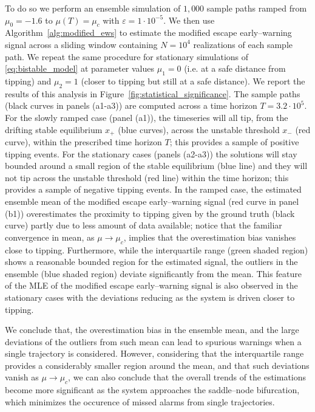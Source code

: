 To do so we perform an ensemble simulation of $1{,}000$ sample paths ramped from $\mu_0=-1.6$ to $\mu(T)=\mu_c$ with $\varepsilon=1\cdot10^{-5}$.
We then use Algorithm~\ref{alg:modified_ews} to estimate the modified escape early--warning signal across a sliding window containing $N=10^4$ realizations of each sample path.
We repeat the same procedure for stationary simulations of \eqref{eq:bistable_model} at parameter values $\mu_1=0$ (i.e. at a safe distance from tipping) and $\mu_2=1$ (closer to tipping but still at a safe distance).
We report the results of this analysis in Figure~\ref{fig:statistical_significance}.
The sample paths (black curves in panels (a1-a3)) are computed across a time horizon $T=3.2\cdot10^5$. 
For the slowly ramped case (panel (a1)), the timeseries will all tip, from the drifting stable equilibrium $x_+$ (blue curves), across the unstable threshold $x_-$ (red curve), within the prescribed time horizon $T$; this provides a sample of positive tipping events.
For the stationary cases (panels (a2-a3)) the solutions will stay bounded around a small region of the stable equilibrium (blue line) and they will not tip across the unstable threshold (red line) within the time horizon; this provides a sample of negative tipping events.
In the ramped case, the estimated ensemble mean of the modified escape early--warning signal (red curve in panel (b1)) overestimates the proximity to tipping given by the ground truth (black curve) partly due to less amount of data available; notice that the familiar convergence in mean, as $\mu\to\mu_c$, implies that the overestimation bias vanishes close to tipping.
Furthermore, while the interquartile range (green shaded region) shows a reasonable bounded region for the estimated signal, the outliers in the ensemble (blue shaded region) deviate significantly from the mean.
This feature of the MLE of the modified escape early--warning signal is also observed in the stationary cases with the deviations reducing as the system is driven closer to tipping.

We conclude that, the overestimation bias in the ensemble mean, and the large deviations of the outliers from such mean can lead to spurious warnings when a single trajectory is considered.
However, considering that the interquartile range provides a considerably smaller region around the mean, and that such deviations vanish as $\mu\to\mu_c$, we can also conclude that the overall trends of the estimations become more significant as the system approaches the saddle--node bifurcation, which minimizes the occurence of missed alarms from single trajectories.
